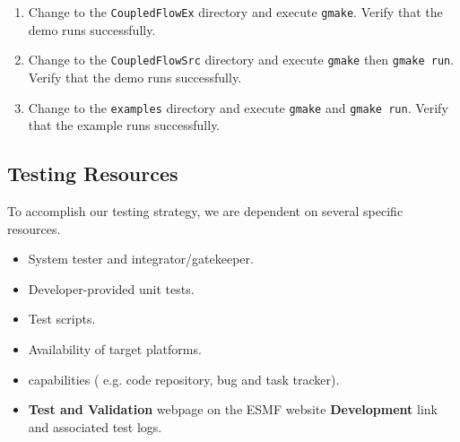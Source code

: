 \begin{enumerate}
\item Change to the {\tt CoupledFlowEx} directory and execute {\tt gmake}. Verify that the demo runs successfully.
\item Change to the {\tt CoupledFlowSrc} directory and execute {\tt gmake} then {\tt gmake run}. Verify that the demo runs successfully.
\item Change to the {\tt examples} directory and execute {\tt gmake} and {\tt gmake run}. Verify that the example runs successfully.
\end{enumerate}


\subsection{Testing Resources}

To accomplish our testing strategy, we are dependent on several specific
resources. 

\begin{itemize}
\item System tester and integrator/gatekeeper.
\item Developer-provided unit tests.
\item Test scripts.
\item Availability of target platforms.
\item {}
capabilities ( e.g. code repository, bug and task tracker).
\item {\bf Test and Validation} webpage on the ESMF website {\bf Development}
link and associated test logs.
\end{itemize}














